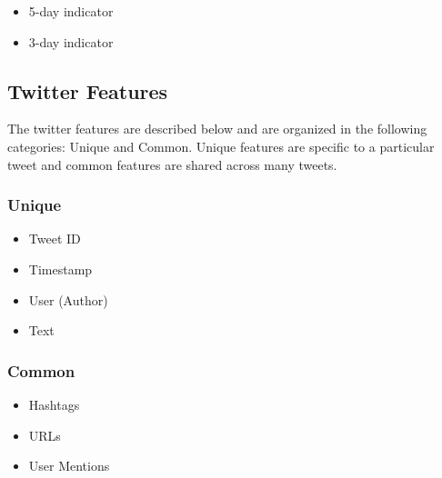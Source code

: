 \documentclass[journal]{IEEEtran}
\begin{document}
\begin{itemize}
	\item 5-day indicator
	\item 3-day indicator
\end{itemize}

\subsection{Twitter Features}

The twitter features are described below and are organized in the
following categories: Unique and Common.
Unique features are specific to a particular tweet and
 common features are shared across many tweets.

\subsubsection{Unique}

\begin{itemize}
	\item Tweet ID
	\item Timestamp
	\item User (Author)
	\item Text
\end{itemize}

\subsubsection{Common}

\begin{itemize}
	\item Hashtags
	\item URLs
	\item User Mentions
\end{itemize}
\end{document}

